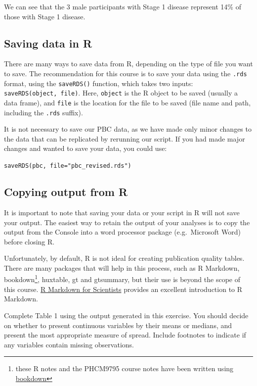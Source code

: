 \documentclass[
  a4paper,
]{memoir}
\begin{document}
We can see that the 3 male participants with Stage 1 disease represent
14\% of those with Stage 1 disease.

\hypertarget{saving-data-in-r}{%
\subsection{Saving data in R}\label{saving-data-in-r}}

There are many ways to save data from R, depending on the type of file
you want to save. The recommendation for this course is to save your
data using the \texttt{.rds} format, using the \texttt{saveRDS()}
function, which takes two inputs: \texttt{saveRDS(object,\ file)}. Here,
\texttt{object} is the R object to be saved (usually a data frame), and
\texttt{file} is the location for the file to be saved (file name and
path, including the \texttt{.rds} suffix).

It is not necessary to save our PBC data, as we have made only minor
changes to the data that can be replicated by rerunning our script. If
you had made major changes and wanted to save your data, you could use:

\texttt{saveRDS(pbc,\ file="pbc\_revised.rds")}

\hypertarget{copying-output-from-r}{%
\subsection{Copying output from R}\label{copying-output-from-r}}

It is important to note that saving your data or your script in R will
not save your output. The easiest way to retain the output of your
analyses is to copy the output from the Console into a word processor
package (e.g.~Microsoft Word) before closing R.

Unfortunately, by default, R is not ideal for creating publication
quality tables. There are many packages that will help in this process,
such as R Markdown, bookdown\footnote{these R notes and the PHCM9795
  course notes have been written using
  \href{https://bookdown.org/yihui/bookdown/}{bookdown}}, huxtable, gt
and gtsummary, but their use is beyond the scope of this course.
\href{https://rmd4sci.njtierney.com/}{R Markdown for Scientists}
provides an excellent introduction to R Markdown.

\begin{tcolorbox}[enhanced jigsaw, title={TASK}, opacitybacktitle=0.6, colbacktitle=quarto-callout-note-color!10!white, titlerule=0mm, colframe=quarto-callout-note-color-frame, opacityback=0, left=2mm, breakable, bottomtitle=1mm, coltitle=black, bottomrule=.15mm, arc=.35mm, rightrule=.15mm, toptitle=1mm, colback=white, toprule=.15mm, leftrule=.75mm]

Complete Table 1 using the output generated in this exercise. You should
decide on whether to present continuous variables by their means or
medians, and present the most appropriate measure of spread. Include
footnotes to indicate if any variables contain missing observations.

\end{tcolorbox}
\end{document}
